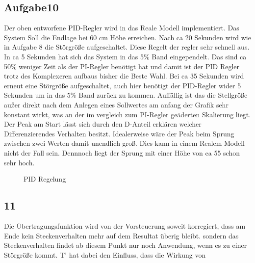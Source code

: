 \documentclass[10pt]{scrartcl}
\begin{document}
\subsection{Aufgabe10}	
Der oben entworfene PID-Regler wird in das Reale Modell implementiert.
Das System Soll die Endlage bei 60 cm Höhe erreichen. Nach ca 20 Sekunden wird wie in Aufgabe 8 die Störgröße aufgeschaltet. Diese Regelt der regler sehr schnell aus. In ca 5 Sekunden hat sich das System in das 5\% Band eingependelt. Das sind ca 50\% weniger Zeit als der PI-Regler benötigt hat und damit ist der PID Regler trotz des Komplexeren aufbaus bisher die Beste Wahl.
Bei ca 35 Sekunden wird erneut eine Störgröße aufgeschaltet, auch hier benötigt der PID-Regler wider 5 Sekunden um in das 5\% Band zurück zu kommen.
Auffällig ist das die Stellgröße außer direkt nach dem Anlegen eines Sollwertes am anfang der Grafik sehr konstant wirkt, was an der im vergleich zum PI-Regler geäderten Skalierung liegt.
Der Peak am Start lässt sich durch den D-Anteil erklären welcher Differenzierendes Verhalten besitzt. Idealerweise wäre der Peak beim Sprung zwischen zwei Werten damit unendlich groß. Dies kann in einem Realem Modell nicht der Fall sein. Dennnoch liegt der Sprung mit einer Höhe von ca 55 schon sehr hoch.
\begin{figure} [H]
\caption{PID Regelung} 
\end{figure}

\subsection{11}
Die Übertragungsfunktion wird von der Vorsteuerung soweit korregiert, dass am Ende kein Steckenverhalten mehr auf dem Resultat überig bleibt. sondern das Steckenverhalten findet ab diesem Punkt nur noch Anwendung, wenn es zu einer Störgröße kommt. T' hat dabei den Einfluss, dass die Wirkung von 
\end{document}
